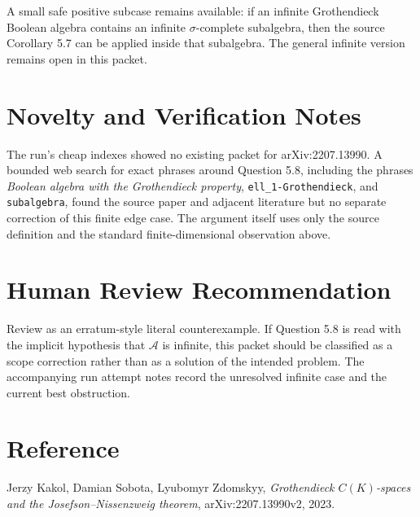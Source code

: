\documentclass[11pt]{article}
\newcommand{\A}{\mathcal A}
\begin{document}
A small safe positive subcase remains available: if an infinite Grothendieck
Boolean algebra contains an infinite \(\sigma\)-complete subalgebra, then the
source Corollary 5.7 can be applied inside that subalgebra.  The general
infinite version remains open in this packet.

\section*{Novelty and Verification Notes}

The run's cheap indexes showed no existing packet for arXiv:2207.13990.  A
bounded web search for exact phrases around Question 5.8, including the
phrases \emph{Boolean algebra with the Grothendieck property},
\texttt{ell\_1-Grothendieck}, and \texttt{subalgebra}, found the source paper
and adjacent literature but no separate correction of this finite edge case.
The argument itself uses only the source definition and the standard
finite-dimensional observation above.

\section*{Human Review Recommendation}

Review as an erratum-style literal counterexample.  If Question 5.8 is read
with the implicit hypothesis that \(\A\) is infinite, this packet should be
classified as a scope correction rather than as a solution of the intended
problem.  The accompanying run attempt notes record the unresolved infinite
case and the current best obstruction.

\section*{Reference}

Jerzy Kakol, Damian Sobota, Lyubomyr Zdomskyy, \emph{Grothendieck
\(C(K)\)-spaces and the Josefson--Nissenzweig theorem},
arXiv:2207.13990v2, 2023.
\end{document}
